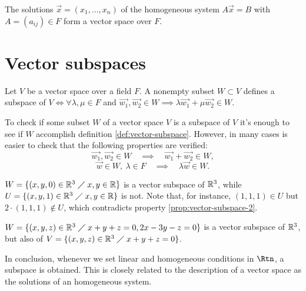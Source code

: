 \begin{example}
    The solutions $\vec{x} = \left( x_1, \ldots, x_n \right) $ of the homogeneous system $A\vec{x} = B$
    with $A = \left( a_{ij} \right) \in F$ form a vector space over $F$.
\end{example}

\section{Vector subspaces}
\begin{defi} \label{def:vector-subspace}
    Let $V$ be a vector space over a field $F$. A nonempty subset $W\subset V$ defines a subspace of $V
    \iff \forall \lambda, \mu\in F$ and $\vec{w_1}, \vec{w_2}\in W\implies \lambda\vec{w_1} +
        \mu\vec{w_2}\in W$.
\end{defi}

To check if some subset $W$ of a vector space $V$ is a subspace of $V$ it's enough to see if $W$ accomplish
definition \ref{def:vector-subspace}. However, in many cases is easier to check that the following properties
are verified:
\begin{equation}
    \vec{w_1}, \vec{w_2}\in W \quad\implies\quad \vec{w_1} + \vec{w_2}\in W,
\end{equation}
\begin{equation} \label{prop:vector-subspace-2}
    \vec{w}\in W,\ \lambda\in F\quad\implies\quad \lambda\vec{w}\in W.
\end{equation}

\begin{example}
    $W = \{\left( x, y, 0 \right)\in \mathbb{R}^3\;\diagup\; x, y\in\mathbb{R}\} $ is a vector subspace of $\mathbb{R}^3$, while $U = \{\left( x, y, 1 \right) \in\mathbb{R}^3\;\diagup\; x, y\in\mathbb{R}\} $ is not. Note that, for instance, $\left( 1, 1, 1 \right)\in U$ but
    $2\cdot\left( 1, 1, 1 \right) \not\in U$, which contradicts property \ref{prop:vector-subspace-2}.
\end{example}

\begin{example}
    $W = \{\left( x, y, z \right) \in\mathbb{R}^3\;\diagup\; x + y + z = 0, 2x - 3y - z = 0\} $ is a vector subspace of $\mathbb{R}^3$,
    but also of $V = \{\left( x, y, z \right) \in\mathbb{R}^3\;\diagup\; x + y + z = 0\} $.
\end{example}

In conclusion, whenever we set linear and homogeneous conditions in $\Rtn$, a subspace is obtained. This is
closely related to the description of a vector space as the solutions of an homogeneous system.

